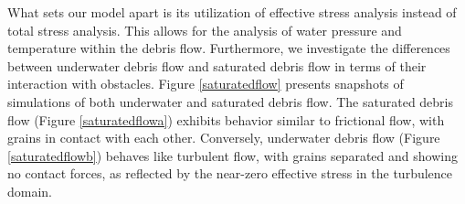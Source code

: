 \documentclass[preprint,12pt]{elsarticle}
\begin{document}
What sets our model apart is its utilization of effective stress analysis instead of total stress analysis. This allows for the analysis of water pressure and temperature within the debris flow. Furthermore, we investigate the differences between underwater debris flow and saturated debris flow in terms of their interaction with obstacles. Figure \ref{saturatedflow} presents snapshots of simulations of both underwater and saturated debris flow. The saturated debris flow (Figure \ref{saturatedflowa}) exhibits behavior similar to frictional flow, with grains in contact with each other. Conversely, underwater debris flow (Figure \ref{saturatedflowb}) behaves like turbulent flow, with grains separated and showing no contact forces, as reflected by the near-zero effective stress in the turbulence domain.
%
%
%
%
\end{document}
